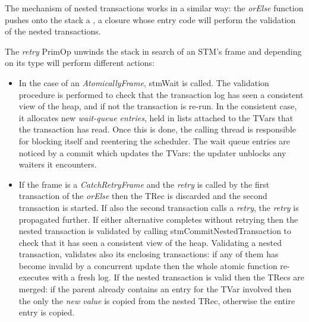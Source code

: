 The mechanism of nested transactions works in a similar way: the \emph{orElse} function pushes onto the stack a , a closure whose entry code will perform the validation of the nested transactions.

The \emph{retry} PrimOp unwinds the stack in search of an STM's frame and depending on its type will perform different actions:
\begin{itemize}
\item
In the case of an \emph{AtomicallyFrame}, stmWait is called.
The validation procedure is performed to check that the transaction log has seen a consistent view of the heap, and if not the transaction is re-run.
In the consistent case, it allocates new \emph{wait-queue entries}, held in  lists attached to the TVars that the transaction has read. 
Once this is done, the calling thread is responsible for blocking itself and reentering the scheduler. The wait queue entries are noticed by a commit which updates the TVars: the updater unblocks any waiters it encounters.
\item
If the frame is a \emph{CatchRetryFrame} and the \emph{retry} is called by the first transaction of the \emph{orElse} then the TRec is discarded and the second transaction is started. If also the second transaction calls a \emph{retry}, the \emph{retry} is propagated further.
If either alternative completes without retrying then the nested transaction is validated by calling stmCommitNestedTransaction to check that it has seen a consistent view of the heap. Validating a nested transaction, validates also its enclosing transactions: if any of them has become invalid by a concurrent update then the whole atomic function re-executes with a fresh log.  If the nested transaction is valid then the TRecs are merged: if the parent already contains an entry for the TVar involved then the only the \emph{new value} is copied from the nested TRec, otherwise the entire entry is copied.
\end{itemize}
\newpage